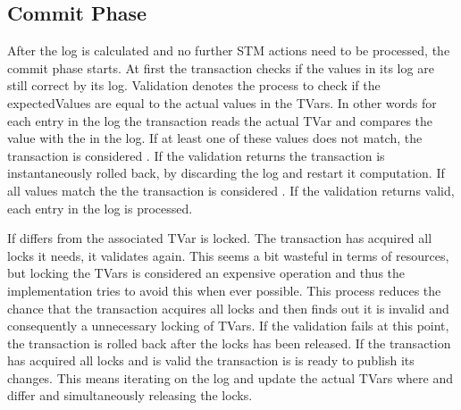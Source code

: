 \subsection{Commit Phase}
\label{Sec:STMImplCommit}
After the log is calculated and no further STM actions need to be processed, the commit phase starts.
At first the transaction checks if the values in its log are still correct by  its log.
Validation denotes the process to check if the expectedValues are equal to the actual values in the TVars.
In other words for each entry in the log the transaction reads the actual TVar and compares the value with 
the  in the log. If at least one of these values does not match, the transaction is considered
. If the validation returns the transaction is instantaneously rolled back, by discarding the log 
and restart it computation. If all values match the the transaction is considered . If the validation
returns valid, each entry in the log is processed. 

If  differs from  the associated TVar is locked. The transaction has acquired all 
locks it needs, it validates again. This seems a bit wasteful in terms of resources, but locking the TVars is considered
an expensive operation and thus the implementation tries to avoid this when ever possible. This process reduces the chance
that the transaction acquires all locks and then finds out it is invalid and consequently a unnecessary locking of TVars.
If the validation fails at this point, the transaction is rolled back after the locks has been released.
If the transaction has acquired all locks and is valid the transaction is is ready to publish its changes.
This means iterating on the log and update the actual TVars where  and  differ and
simultaneously releasing the locks. 

